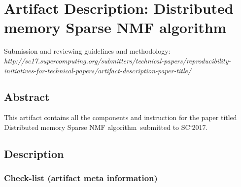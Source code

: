 \documentclass[sigconf, review=false]{acmart}
\newcommand{\distspnmffull}{Distributed memory Sparse NMF algorithm}
\begin{document}




\appendix
\section{Artifact Description: \distspnmffull}

Submission and reviewing guidelines and methodology: \\
{\small\em http://sc17.supercomputing.org/submitters/technical-papers/reproducibility-initiatives-for-technical-papers/artifact-description-paper-title/}

\subsection{Abstract}

This artifact contains all the components and instruction for the paper titled \distspnmffull\ submitted to SC`2017. 

\subsection{Description}

\subsubsection{Check-list (artifact meta information)}
\end{document}
